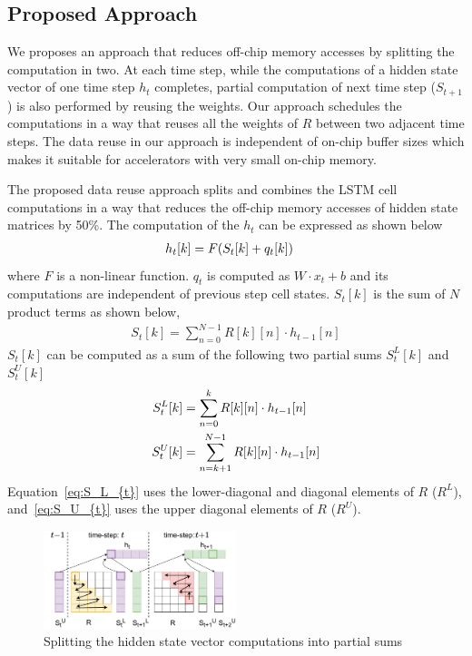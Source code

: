 \documentclass[a4paper,10pt]{article}
\begin{document}
\subsection{Proposed Approach}
We proposes an approach that reduces off-chip memory accesses by splitting the computation in two. At each time step, while the computations of a hidden state vector of one time step $h_t$ completes, partial computation of next time step ($S_{t+1}$) is also performed by reusing the weights.
Our approach schedules the computations in a way that reuses all the weights of $R$ between two adjacent time steps. The data reuse in our approach is independent of on-chip buffer sizes which makes it suitable for accelerators with very small on-chip memory.

The proposed data reuse approach splits and combines the LSTM cell computations in a way that reduces the off-chip memory accesses of hidden state matrices by 50\%. The computation of the $h_t$ can be expressed as shown below
\begin{align}\label{eq:h_{t}}
	h_{t}[k] &= F( S_{t}[k]+q_{t}[k])
\end{align}
where $F$ is a non-linear function. $q_{t}$ is computed as $W{\cdot}x_t{+}b$ and its computations are independent of previous step cell states. $S_{t}[k]$ is the sum of $N$ product terms as shown below,
\begin{align}
	S_{t}[k] = \sum_{n=0}^{N-1}R[k][n]\cdot h_{t-1}[n]
\end{align}
$S_{t}[k]$ can be computed as a sum of the following two partial sums $S_{t}^{L}[k]$ and $S_{t}^{U}[k]$
\begin{align}      
	S_{t}^{L}[k] &= \sum_{n=0}^{k}R[k][n]\cdot h_{t-1}[n] \label{eq:S_L_{t}}\\
	S_{t}^{U}[k] &= \sum_{n=k+1}^{N-1}R[k][n]\cdot h_{t-1}[n] \label{eq:S_U_{t}}
\end{align}
Equation~\eqref{eq:S_L_{t}} uses the lower-diagonal and diagonal elements of $R$ ($R^L$), and~\eqref{eq:S_U_{t}} uses the upper diagonal elements of $R$ ($R^U$). 
\begin{figure}[!tb]
	\centerline{\includegraphics[width=0.5\textwidth]{TwoTimeSteps.pdf}}
	\caption{Splitting the hidden state vector computations into partial sums}
	\label{fig:TwoTimeStepsComputation}
	\vspace{-1.0em}	
\end{figure}
\end{document}
